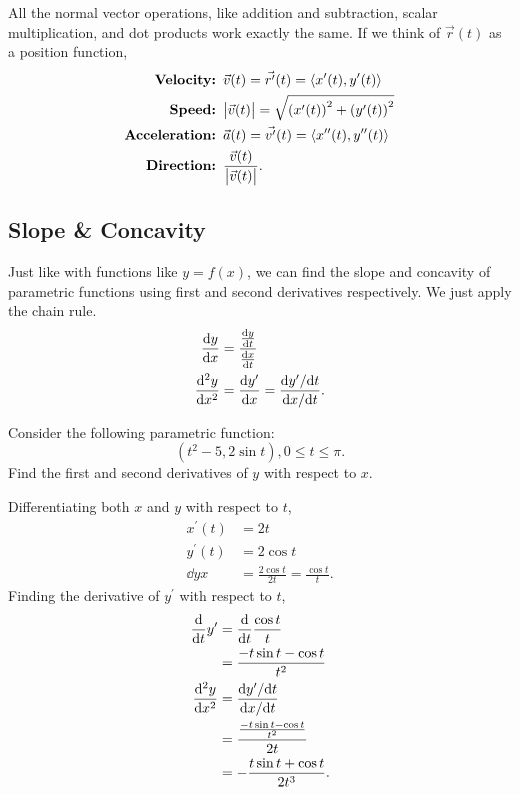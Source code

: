 All the normal vector operations, like addition and subtraction, scalar multiplication, and dot products work exactly the same.
If we think of $\vec{r}(t)$ as a position function,
\begin{align*}
	\textbf{Velocity: }& \vec{v}(t) = \vec{r^\prime}(t) = \langle x^\prime(t), y^\prime(t) \rangle \\
	\textbf{Speed: }& \big\lvert \vec{v}(t) \big\rvert = \sqrt{\left(x^\prime(t)\right)^2 + \left(y^\prime(t)\right)^2} \\
	\textbf{Acceleration: }& \vec{a}(t) = \vec{v^\prime}(t) = \langle x^{\prime\prime}(t), y^{\prime\prime}(t) \rangle \\
	\textbf{Direction: }& \frac{\vec{v}(t)}{\big\lvert \vec{v}(t) \big\rvert}.
\end{align*}

\subsection{Slope \& Concavity}
Just like with functions like $y=f(x)$, we can find the slope and concavity of parametric functions using first and second derivatives respectively.
We just apply the chain rule.
\begin{align*}
	\frac{\mathrm{d} y}{\mathrm{d} x} &= \frac{\frac{\mathrm{d} y}{\mathrm{d} t}}{\frac{\mathrm{d} x}{\mathrm{d} t}} \\
	\frac{\mathrm{d} ^2y}{\mathrm{d} x^2} &= \frac{\mathrm{d} y^\prime}{\mathrm{d} x} = \frac{\mathrm{d} y^\prime/\mathrm{d} t}{\mathrm{d} x/\mathrm{d} t}.
\end{align*}

\begin{example}
	Consider the following parametric function:
	\begin{equation*}
		(t^2-5, 2\sin{t}), 0\leq t\leq\pi.
	\end{equation*}
	Find the first and second derivatives of $y$ with respect to $x$.
\end{example}
\begin{answer}
	Differentiating both $x$ and $y$ with respect to $t$,
	\begin{align*}
		x^\prime(t) &= 2t \\
		y^\prime(t) &= 2\cos{t} \\
		\dd{y}{x} &= \frac{2\cos{t}}{2t} = \frac{\cos{t}}{t}.
	\end{align*}
	Finding the derivative of $y^\prime$ with respect to $t$,
	\begin{align*}
		\frac{\mathrm{d}}{\mathrm{d} t}y^\prime &= \frac{\mathrm{d}}{\mathrm{d} t}\frac{\cos{t}}{t} \\
		&= \frac{-t\sin{t}-\cos{t}}{t^2} \\
		\frac{\mathrm{d} ^2y}{\mathrm{d} x^2} &= \frac{\mathrm{d} y^\prime/\mathrm{d} t}{\mathrm{d} x/\mathrm{d} t} \\
		&= \frac{\frac{-t\sin{t}-\cos{t}}{t^2}}{2t} \\
		&= -\frac{t\sin{t}+\cos{t}}{2t^3}.
	\end{align*}
\end{answer}

